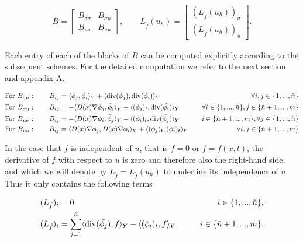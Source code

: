 \documentclass[../draft_1.tex]{subfiles}
\begin{document}
\begin{ceqn}
	\begin{align}
B = \begin{bmatrix}
B_{\sigma \sigma} & B_{\sigma u} \\
B_{u \sigma}  & B_{uu} 
\end{bmatrix},
\qquad
 L_{\tilde{f}}(u_h) = \begin{bmatrix}
(L_{\tilde{f}}(u_h))_{\sigma} \\
(L_{\tilde{f}}(u_h))_u
 \end{bmatrix}.
	\end{align}
\end{ceqn}
Each entry of each of the blocks of $B$ can be computed explicitly according to the subsequent schemes. For the detailed computation we refer to the next section and appendix A. 
\begin{ceqn}
	\begin{align}
	\label{blocks_B_begin}
&\text{For } B_{\sigma \sigma} :	\qquad B_{ij} = \langle \tilde{\phi}_j, \tilde{\phi}_i \rangle_Y + \langle \mathop{}\!\mathrm{div}(\tilde{\phi_j}), \mathop{}\!\mathrm{div}(\tilde{\phi_i}) \rangle_Y \quad &\forall i,j \in \{1, ..., \tilde{n}\} \\
&\text{For } B_{\sigma u} : \qquad B_{ij} = - \langle D(x) \nabla \phi_j, \tilde{\phi}_i \rangle_Y - \langle (\phi_j)_t, \mathop{}\!\mathrm{div}(\tilde{\phi_i}) \rangle_Y \quad &\forall i \in \{1, ..., \tilde{n}\}, j \in \{\tilde{n}+1, ..., m\} \\
&\text{For } B_{u \sigma} : \qquad B_{ij} = - \langle D(x) \nabla \phi_i, \tilde{\phi}_j \rangle_Y - \langle (\phi_i)_t, \mathop{}\!\mathrm{div}(\tilde{\phi_j}) \rangle_Y \quad &i \in \{\tilde{n}+1, ..., m\}, \forall j \in \{1, ..., \tilde{n}\}\\
&\text{For } B_{uu} : \qquad B_{ij} = \langle D(x) \nabla \phi_j, D(x) \nabla \phi_i \rangle_Y + \langle (\phi_j)_t, (\phi_i)_t \rangle_Y \quad &\forall i,j \in \{\tilde{n}+1, ..., m\}
\label{block_B_end}
\end{align}
\end{ceqn}
In the case that $f$ is independent of $u$, that is $f = 0$ or $f = f(x,t)$, the derivative of $f$ with respect to $u$ is zero and therefore also the right-hand side, and which we will denote by $L_{\tilde{f}} = L_{\tilde{f}}(u_h)$ to underline its independence of $u$. Thus it only contains the following terms
\begin{ceqn}
	\begin{align}
&(L_{\tilde{f}})_i = 0 \qquad &i \in \{1, ..., \tilde{n} \}, \\
&(L_{\tilde{f}})_i = \sum_{j=1}^{\tilde{n}}\langle \mathop{}\!\mathrm{div}(\tilde{\phi_j}), f \rangle_Y - \langle (\phi_i)_t, f \rangle_Y \qquad  &i \in \{\tilde{n}+1, ..., m\}.
\end{align}
\end{ceqn}
\end{document}
